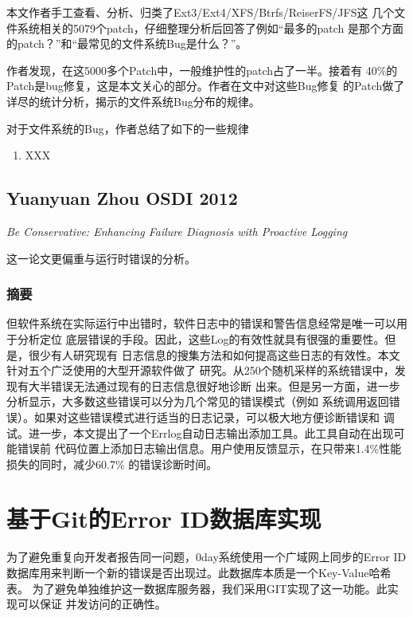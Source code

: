 \documentclass[a4paper]{article}
\begin{document}
本文作者手工查看、分析、归类了Ext3/Ext4/XFS/Btrfs/ReiserFS/JFS这
几个文件系统相关的5079个patch，仔细整理分析后回答了例如“最多的patch
是那个方面的patch？”和“最常见的文件系统Bug是什么？”。

作者发现，在这5000多个Patch中，一般维护性的patch占了一半。接着有
40\%的Patch是bug修复，这是本文关心的部分。作者在文中对这些Bug修复
的Patch做了详尽的统计分析，揭示的文件系统Bug分布的规律。

对于文件系统的Bug，作者总结了如下的一些规律

\begin{enumerate}
	\item XXX
\end{enumerate}



\subsection{Yuanyuan Zhou  OSDI 2012}
\emph{Be Conservative: Enhancing Failure Diagnosis with Proactive Logging}

这一论文更偏重与运行时错误的分析。

\subsubsection{摘要}
但软件系统在实际运行中出错时，软件日志中的错误和警告信息经常是唯一可以用于分析定位
底层错误的手段。因此，这些Log的有效性就具有很强的重要性。但是，很少有人研究现有
日志信息的搜集方法和如何提高这些日志的有效性。本文针对五个广泛使用的大型开源软件做了
研究。从250个随机采样的系统错误中，发现有大半错误无法通过现有的日志信息很好地诊断
出来。但是另一方面，进一步分析显示，大多数这些错误可以分为几个常见的错误模式（例如
系统调用返回错误）。如果对这些错误模式进行适当的日志记录，可以极大地方便诊断错误和
调试。进一步，本文提出了一个Errlog自动日志输出添加工具。此工具自动在出现可能错误前
代码位置上添加日志输出信息。用户使用反馈显示，在只带来1.4\%性能损失的同时，减少60.7\%
的错误诊断时间。



\section{基于Git的Error ID数据库实现}
为了避免重复向开发者报告同一问题，0day系统使用一个广域网上同步的Error
ID数据库用来判断一个新的错误是否出现过。此数据库本质是一个Key-Value哈希表。
为了避免单独维护这一数据库服务器，我们采用GIT实现了这一功能。此实现可以保证
并发访问的正确性。
\end{document}
